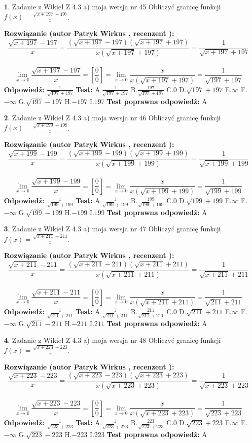 \documentclass[12pt, a4paper]{article}
\theoremstyle{definition} %
\newtheorem{zad}{}
\newcommand{\zadStart}[1]{\begin{zad}#1\newline}
\newcommand{\zadStop}{\end{zad}}
\newcommand{\rozwStart}[2]{\noindent \textbf{Rozwiązanie (autor #1 , recenzent #2): }\newline}
\newcommand{\rozwStop}{\newline}
\newcommand{\odpStart}{\noindent \textbf{Odpowiedź:}\newline}
\newcommand{\odpStop}{\newline}
\newcommand{\testStart}{\noindent \textbf{Test:}\newline}
\newcommand{\testStop}{\newline}
\newcommand{\kluczStart}{\noindent \textbf{Test poprawna odpowiedź:}\newline}
\newcommand{\kluczStop}{\newline}
\begin{document}
\zadStart{Zadanie z Wikieł Z 4.3 a) moja wersja nr 45}
Obliczyć granicę funkcji $f(x)=\frac{\sqrt{x+197}-197}{x}$.
\zadStop
\rozwStart{Patryk Wirkus}{}
$$\frac{\sqrt{x+197}-197}{x}=\frac{(\sqrt{x+197}-197)(\sqrt{x+197}+197)}{x(\sqrt{x+197}+197)}=\frac{1}{\sqrt{x+197}+197}$$
\\
$$\lim\limits_{x\to0}\frac{\sqrt{x+197}-197}{x}=[\frac{0}{0}]=
\lim\limits_{x\to0}\frac{x}{x(\sqrt{x+197}+197)} = \frac{1}{\sqrt{197}+197}$$
\rozwStop
\odpStart
$\frac{1}{\sqrt{197}+197}$
\odpStop
\testStart
A.$\frac{1}{\sqrt{197}+197}$
B.$\frac{197}{\sqrt{197}+197}$
C.$0$
D.$\sqrt{197}+197$
E.$\infty$
F.$-\infty$
G.$\sqrt{197}-197$
H.$-197$
I.$197$
\testStop
\kluczStart
A
\kluczStop



\zadStart{Zadanie z Wikieł Z 4.3 a) moja wersja nr 46}
Obliczyć granicę funkcji $f(x)=\frac{\sqrt{x+199}-199}{x}$.
\zadStop
\rozwStart{Patryk Wirkus}{}
$$\frac{\sqrt{x+199}-199}{x}=\frac{(\sqrt{x+199}-199)(\sqrt{x+199}+199)}{x(\sqrt{x+199}+199)}=\frac{1}{\sqrt{x+199}+199}$$
\\
$$\lim\limits_{x\to0}\frac{\sqrt{x+199}-199}{x}=[\frac{0}{0}]=
\lim\limits_{x\to0}\frac{x}{x(\sqrt{x+199}+199)} = \frac{1}{\sqrt{199}+199}$$
\rozwStop
\odpStart
$\frac{1}{\sqrt{199}+199}$
\odpStop
\testStart
A.$\frac{1}{\sqrt{199}+199}$
B.$\frac{199}{\sqrt{199}+199}$
C.$0$
D.$\sqrt{199}+199$
E.$\infty$
F.$-\infty$
G.$\sqrt{199}-199$
H.$-199$
I.$199$
\testStop
\kluczStart
A
\kluczStop



\zadStart{Zadanie z Wikieł Z 4.3 a) moja wersja nr 47}
Obliczyć granicę funkcji $f(x)=\frac{\sqrt{x+211}-211}{x}$.
\zadStop
\rozwStart{Patryk Wirkus}{}
$$\frac{\sqrt{x+211}-211}{x}=\frac{(\sqrt{x+211}-211)(\sqrt{x+211}+211)}{x(\sqrt{x+211}+211)}=\frac{1}{\sqrt{x+211}+211}$$
\\
$$\lim\limits_{x\to0}\frac{\sqrt{x+211}-211}{x}=[\frac{0}{0}]=
\lim\limits_{x\to0}\frac{x}{x(\sqrt{x+211}+211)} = \frac{1}{\sqrt{211}+211}$$
\rozwStop
\odpStart
$\frac{1}{\sqrt{211}+211}$
\odpStop
\testStart
A.$\frac{1}{\sqrt{211}+211}$
B.$\frac{211}{\sqrt{211}+211}$
C.$0$
D.$\sqrt{211}+211$
E.$\infty$
F.$-\infty$
G.$\sqrt{211}-211$
H.$-211$
I.$211$
\testStop
\kluczStart
A
\kluczStop



\zadStart{Zadanie z Wikieł Z 4.3 a) moja wersja nr 48}
Obliczyć granicę funkcji $f(x)=\frac{\sqrt{x+223}-223}{x}$.
\zadStop
\rozwStart{Patryk Wirkus}{}
$$\frac{\sqrt{x+223}-223}{x}=\frac{(\sqrt{x+223}-223)(\sqrt{x+223}+223)}{x(\sqrt{x+223}+223)}=\frac{1}{\sqrt{x+223}+223}$$
\\
$$\lim\limits_{x\to0}\frac{\sqrt{x+223}-223}{x}=[\frac{0}{0}]=
\lim\limits_{x\to0}\frac{x}{x(\sqrt{x+223}+223)} = \frac{1}{\sqrt{223}+223}$$
\rozwStop
\odpStart
$\frac{1}{\sqrt{223}+223}$
\odpStop
\testStart
A.$\frac{1}{\sqrt{223}+223}$
B.$\frac{223}{\sqrt{223}+223}$
C.$0$
D.$\sqrt{223}+223$
E.$\infty$
F.$-\infty$
G.$\sqrt{223}-223$
H.$-223$
I.$223$
\testStop
\kluczStart
A
\kluczStop
\end{document}
